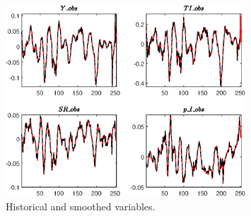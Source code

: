  
\begin{figure}[H]
\centering 
\includegraphics[width=0.80\textwidth]{directed_search/graphs/directed_search_HistoricalAndSmoothedVariables1}
\caption{Historical and smoothed variables.}\label{Fig:HistoricalAndSmoothedVariables:1}
\end{figure}


